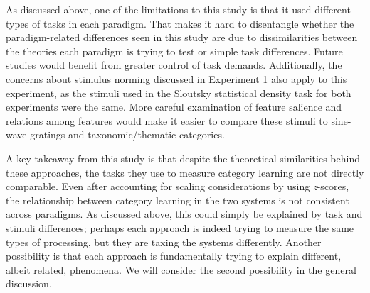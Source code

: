 \documentclass[../dissertation.tex]{subfiles}
\begin{document}
	As discussed above, one of the limitations to this study is that it used different types of tasks in each paradigm. That makes it hard to disentangle whether the paradigm-related differences seen in this study are due to dissimilarities between the theories each paradigm is trying to test or simple task differences. Future studies would benefit from greater control of task demands. Additionally, the concerns about stimulus norming discussed in Experiment 1 also apply to this experiment, as the stimuli used in the Sloutsky statistical density task for both experiments were the same. More careful examination of feature salience and relations among features would make it easier to compare these stimuli to sine-wave gratings and taxonomic/thematic categories. \par
	A key takeaway from this study is that despite the theoretical similarities behind these approaches, the tasks they use to measure category learning are not directly comparable. Even after accounting for scaling considerations by using \textit{z}-scores, the relationship between category learning in the two systems is not consistent across paradigms. As discussed above, this could simply be explained by task and stimuli differences; perhaps each approach is indeed trying to measure the same types of processing, but they are taxing the systems differently. Another possibility is that each approach is fundamentally trying to explain different, albeit related, phenomena. We will consider the second possibility in the general discussion.
\end{document}
